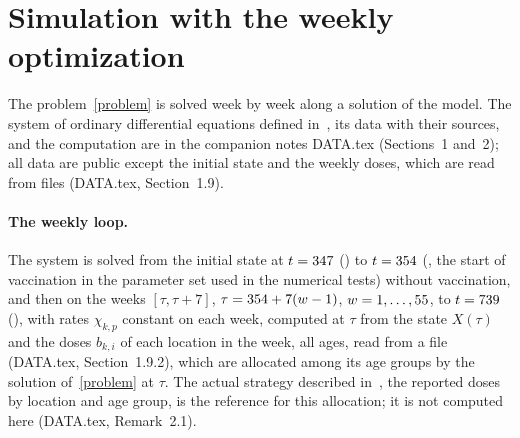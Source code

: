 \documentclass[11pt]{article}
\theoremstyle{plain}
\theoremstyle{remark}
\numberwithin{equation}{section}
\begin{document}
\section{Simulation with the weekly optimization}\label{sec-simulation}

The problem~\eqref{problem} is solved week by week along a solution of the
model. The system of ordinary differential equations
defined in~\cite[Section~2.1]{2026Feng_Day_Glasser}, its data with their sources, and the
computation are in the companion notes DATA.tex (Sections~1 and~2); all data are
public except the initial state and the weekly doses, which are read from files
(DATA.tex, Section~1.9).

\paragraph{The weekly loop.} The system is solved from the initial state at
$t=347$ (\RunTzeroDate) to $t=354$ (\RunTvaccDate, the start of vaccination in
the parameter set used in the numerical tests) without vaccination, and then on the
\RunWeeks{} weeks $[\tau,\tau+7]$, $\tau=354+7(w-1)$, $w=1,\dots,55$, to
$t=739$ (\RunTendDate), with
rates $\chi_{k,p}$ constant on each week, computed at $\tau$ from the state
$X(\tau)$ and the doses $b_{k,i}$ of each location in the week, all ages, read from a
file (DATA.tex, Section~1.9.2), which are allocated among its age groups by the
solution of~\eqref{problem} at $\tau$. The actual strategy described in~\cite{2026Feng_Day_Glasser}, the reported doses by
location and age group, is the reference for this allocation; it is not computed
here (DATA.tex, Remark~2.1).
\end{document}
